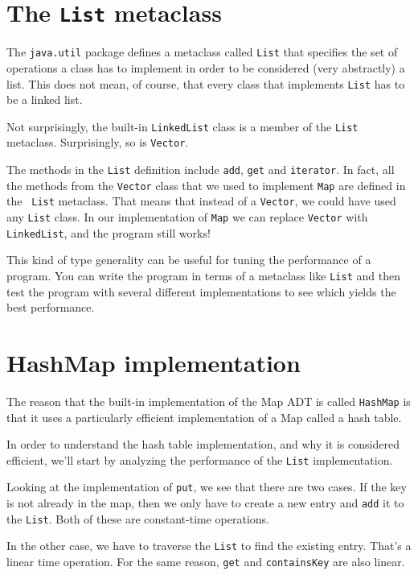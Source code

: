 \documentclass[12pt]{book}
\theoremstyle{exercise}
\begin{document}
\section{The {\tt List} metaclass}
 

The {\tt java.util} package defines a metaclass called
{\tt List} that specifies the set of operations a class has to
implement in order to be considered (very abstractly) a list.
This does not mean, of course, that every class that implements
{\tt List} has to be a linked list.

Not surprisingly, the built-in {\tt LinkedList} class is a member of
the {\tt List} metaclass.  Surprisingly, so is {\tt Vector}.

The methods in the {\tt List} definition include {\tt add}, {\tt get}
and {\tt iterator}.  In fact, all the methods from the {\tt Vector}
class that we used to implement {\tt Map} are defined in the {\tt
List} metaclass.  That means that instead of a {\tt Vector}, we could
have used any {\tt List} class.  In our implementation of {\tt Map} we
can replace {\tt Vector} with {\tt LinkedList}, and the program still
works!

This kind of type generality can be useful for tuning
the performance of a program.  You can write the program in
terms of a metaclass like {\tt List} and then test the
program with several different implementations to see which
yields the best performance.


\section{HashMap implementation}

The reason that the built-in implementation of the Map ADT
is called {\tt HashMap} is that it uses a particularly efficient
implementation of a Map called a hash table.

In order to understand the hash table implementation, and why it is
considered efficient, we'll start by analyzing the performance of the
{\tt List} implementation.

Looking at the implementation of {\tt put}, we see that there are
two cases.  If the key is not already in the map, then we
only have to create a new entry and {\tt add} it to
the {\tt List}.  Both of these are constant-time operations.

In the other case, we have to traverse the {\tt List} to find
the existing entry.  That's a linear time operation.
For the same reason, {\tt get} and {\tt containsKey} are also
linear.
\end{document}
